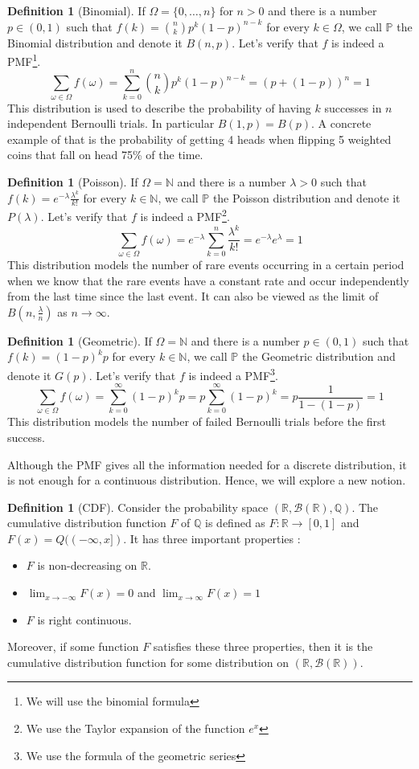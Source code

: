 \documentclass[paper=a4, fontsize=12pt]{scrartcl} %
\theoremstyle{definition}
\newtheorem{defn}[thm]{Definition}
\theoremstyle{remark}
\newcommand{\R}{\mathbb{R}}
\newcommand{\N}{\mathbb{N}}
\newcommand{\Q}{\mathbb{Q}}
\renewcommand{\P}{\mathbb{P}}
\numberwithin{equation}{section} %
\numberwithin{figure}{section} %
\numberwithin{table}{section} %
\begin{document}
\begin{defn}[Binomial]
	If $\Omega = \{0,\dots, n\}$ for $n > 0$ and there is a number $p \in (0,1)$ such that $f(k) = \binom{n}{k}p^k(1-p)^{n-k}$ for every $k \in \Omega$, we call $\P$ the Binomial distribution and denote it $B(n,p)$. Let's verify that $f$ is indeed a PMF\footnote{We will use the binomial formula}.
	\[ \sum_{\omega \in \Omega} f(\omega) = \sum_{k=0}^n \binom{n}{k}p^k(1-p)^{n-k} =  (p + (1-p))^n = 1\]
	This distribution is used to describe the probability of having $k$ successes in $n$ independent Bernoulli trials. In particular $B(1,p) = B(p)$. A concrete example of that is the probability of getting 4 heads when flipping 5 weighted coins that fall on head 75\% of the time.  
\end{defn}
\begin{defn}[Poisson]
	If $\Omega = \N$ and there is a number $\lambda > 0$ such that $f(k) = e^{-\lambda}\frac{\lambda^k}{k!}$ for every $k \in \N$, we call $\P$ the Poisson distribution and denote it $P(\lambda)$. Let's verify that $f$ is indeed a PMF\footnote{We use the Taylor expansion of the function $e^x$}.
	\[ \sum_{\omega \in \Omega}f(\omega) = e^{-\lambda}\sum_{k=0}^n\frac{\lambda^k}{k!} = e^{-\lambda}e^{\lambda} = 1 \]
	This distribution models the number of rare events occurring in a certain period when we know that the rare events have a constant rate and occur independently from the last time since the last event. It can also be viewed as the limit of $B(n, \frac{\lambda}{n})$ as $n \rightarrow \infty$.
\end{defn}
\begin{defn}[Geometric]
	If $\Omega = \N$ and there is a number $p \in (0,1)$ such that $f(k) = (1-p)^kp$ for every $k \in \N$, we call $\P$ the Geometric distribution and denote it $G(p)$. Let's verify that $f$ is indeed a PMF\footnote{We use the formula of the geometric series}.
	\[\sum_{\omega \in \Omega} f(\omega) = \sum_{k=0}^{\infty} (1-p)^kp = p\sum_{k=0}^{\infty} (1-p)^k = p\frac{1}{1-(1-p)} = 1\]
	This distribution models the number of failed Bernoulli trials before the first success.
\end{defn}
Although the PMF gives all the information needed for a discrete distribution, it is not enough for a continuous distribution. Hence, we will explore a new notion.
\begin{defn}[CDF]
	Consider the probability space $(\R, \mathcal{B}(\R), \Q)$. The cumulative distribution function $F$ of $\Q$ is defined as $F : \R \rightarrow [0,1]$ and $F(x) = Q((-\infty,x])$. It has three important properties : 
	\begin{itemize}
		\item $F$ is non-decreasing on $\R$.
		\item $\lim_{x\rightarrow -\infty}F(x) = 0$ and $\lim_{x\rightarrow \infty}F(x) = 1$
		\item $F$ is right continuous.
	\end{itemize}
	Moreover, if some function $F$ satisfies these three properties, then it is the cumulative distribution function for some distribution on $(\R, \mathcal{B}(\R))$.
\end{defn}
\end{document}
